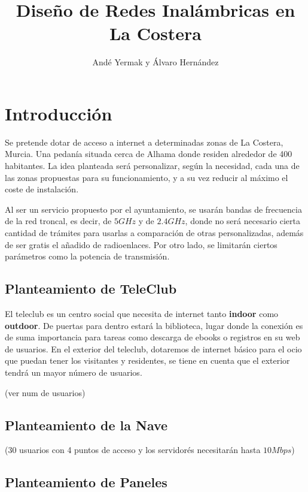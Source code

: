 \documentclass{article}
\title{Diseño de Redes Inalámbricas en La Costera}
\author{Andé Yermak y Álvaro Hernández}
\begin{document}
\maketitle

\tableofcontents
\newpage

\section{Introducción}

Se pretende dotar de acceso a internet a determinadas zonas de La Costera, Murcia. Una pedanía situada cerca de Alhama donde residen alrededor de 400 habitantes. La idea planteada será personalizar, según la necesidad, cada una de las zonas propuestas para su funcionamiento, y a su vez reducir al máximo el coste de instalación.

\quad

Al ser un servicio propuesto por el ayuntamiento, se usarán bandas de frecuencia de la red troncal, es decir, de $5GHz$ y de $2.4GHz$, donde no será necesario cierta cantidad de trámites para usarlas a comparación de otras personalizadas, además de ser gratis el añadido de radioenlaces. Por otro lado, se limitarán ciertos parámetros como la potencia de transmisión.

\subsection{Planteamiento de TeleClub}

El teleclub es un centro social que necesita de internet tanto \textbf{indoor} como \textbf{outdoor}. De puertas para dentro estará la biblioteca, lugar donde la conexión es de suma importancia para tareas como descarga de ebooks o registros en su web de usuarios. En el exterior del teleclub, dotaremos de internet básico para el ocio que puedan tener los visitantes y residentes, se tiene en cuenta que el exterior tendrá un mayor número de usuarios.

(ver num de usuarios)

\subsection{Planteamiento de la Nave}

(30 usuarios con 4 puntos de acceso y los servidorés necesitarán hasta $10Mbps$)

\subsection{Planteamiento de Paneles}
\end{document}
